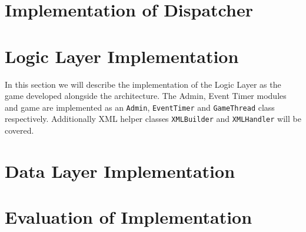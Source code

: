 \section{Implementation of Dispatcher}



\section{Logic Layer Implementation}
In this section we will describe the implementation of the Logic Layer as the game developed alongside the architecture. The Admin, Event Timer modules and game are implemented as an \texttt{Admin}, \texttt{EventTimer} and \texttt{GameThread} class respectively. Additionally XML helper classes \texttt{XMLBuilder} and \texttt{XMLHandler} will be covered.






\section{Data Layer Implementation}


\section{Evaluation of Implementation}